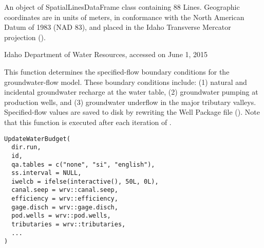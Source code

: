 \documentclass[a4paper]{book}
\begin{document}
%
\begin{Format}
An object of SpatialLinesDataFrame class containing 88 Lines.
Geographic coordinates are in units of meters, in conformance with the
North American Datum of 1983 (NAD 83), and placed in the
Idaho Transverse Mercator projection ().
\end{Format}
%
\begin{Source}\relax
Idaho Department of Water Resources, accessed on June 1, 2015
\end{Source}
%
\begin{Examples}
\end{Examples}
%
\begin{Description}\relax
This function determines the specified-flow boundary conditions for the groundwater-flow model.
These boundary conditions include:
(1) natural and incidental groundwater recharge at the water table,
(2) groundwater pumping at production wells, and
(3) groundwater underflow in the major tributary valleys.
Specified-flow values are saved to disk by rewriting the
 Well Package file ().
Note that this function is executed after each iteration of .
\end{Description}
%
\begin{Usage}
\begin{verbatim}
UpdateWaterBudget(
  dir.run,
  id,
  qa.tables = c("none", "si", "english"),
  ss.interval = NULL,
  iwelcb = ifelse(interactive(), 50L, 0L),
  canal.seep = wrv::canal.seep,
  efficiency = wrv::efficiency,
  gage.disch = wrv::gage.disch,
  pod.wells = wrv::pod.wells,
  tributaries = wrv::tributaries,
  ...
)
\end{verbatim}
\end{Usage}
%
\end{document}
